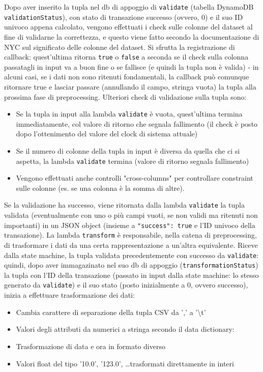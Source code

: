 \documentclass[
    sigconf, 
    screen=false, 
    acmthm=false, 
    nonacm
]{acmart}
\begin{document}
Dopo aver inserito la tupla nel db di appoggio di \texttt{validate} (tabella DynamoDB \texttt{validationStatus}), 
con stato di transazione successo (ovvero, 0) e il suo ID univoco appena calcolato,
vengono effettuati i check sulle colonne del 
dataset al fine di validarne la correttezza, e questo viene fatto secondo la documentazione di NYC 
\cite{nycdatadict} sul significato delle colonne del dataset. Si sfrutta la registrazione di callback: quest'ultima 
ritorna \texttt{true} o \texttt{false} a seconda se il check sulla colonna passatagli in input va a buon fine o se 
fallisce (e quindi la tupla non è valida) - in 
alcuni casi, se i dati non sono ritenuti fondamentali, la callback può comunque ritornare true e lasciar passare
(annullando il campo, stringa vuota) la tupla alla prossima fase di preprocessing.
Ulteriori check di validazione sulla tupla sono:
\begin{itemize}
    \item Se la tupla in input alla lambda \texttt{validate} è vuota, quest'ultima termina immediatamente, col 
    valore di ritorno che segnala fallimento (il check 
    è posto dopo l'ottenimento del valore del clock di sistema attuale)
    \item Se il numero di colonne della tupla in input è diversa da quella che ci si aspetta, la lambda 
    \texttt{validate} termina (valore di ritorno segnala fallimento)
    \item Vengono effettuati anche controlli "cross-columns" per controllare constraint sulle colonne (es. se una 
    colonna è la somma di altre).
\end{itemize}
Se la validazione ha successo, viene ritornata dalla lambda \texttt{validate} la tupla validata (eventualmente con
uno o più campi vuoti, se non validi ma ritenuti non importanti) in un JSON object (insieme a \texttt{"success": 
true} e l'ID univoco della transazione).
La lambda \texttt{transform} è responsabile, nella catena di preprocessing, di trasformare i dati da una certa 
rappresentazione a un'altra equivalente. Riceve dalla state machine, la tupla validata precedentemente con successo 
da \texttt{validate}: quindi, dopo aver immagazinato nel suo db di appoggio (\texttt{transformationStatus}) la 
tupla con l'ID della transazione (passato in input dalla state machine: lo stesso generato da \texttt{validate}) e il suo 
stato (posto inizialmente a 0, ovvero successo), inizia a effettuare trasformazione dei dati:
\begin{itemize}
    \item Cambia carattere di separazione della tupla CSV da ',' a '\textbackslash t'
    \item Valori degli attributi da numerici a stringa secondo il data dictionary: \cite{nycdatadict}
    \item Trasformazione di data e ora in formato diverso
    \item Valori float del tipo '10.0', '123.0', \dots trasformati direttamente in interi
\end{itemize}
\end{document}
